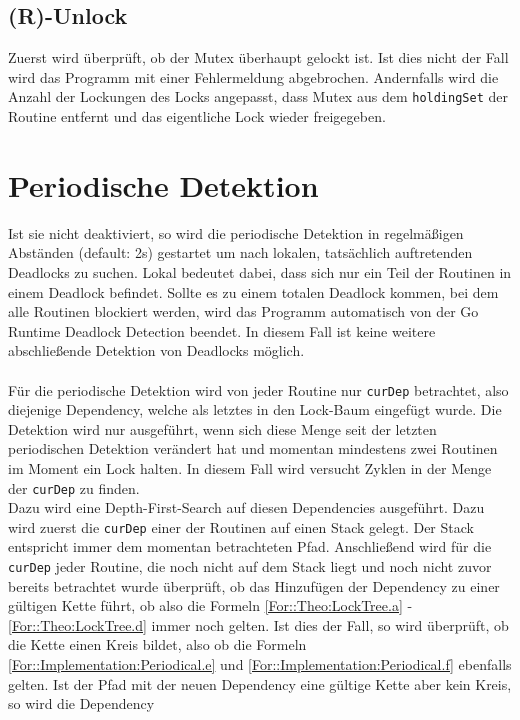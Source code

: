 \subsection{(R)-Unlock}
Zuerst wird überprüft, ob der Mutex überhaupt gelockt ist. Ist dies nicht der 
Fall wird das Programm mit einer Fehlermeldung abgebrochen. Andernfalls
wird die Anzahl der Lockungen des Locks angepasst, dass Mutex aus dem 
\texttt{holdingSet} der Routine entfernt und das eigentliche Lock wieder freigegeben.

\section{Periodische Detektion} \label{Kap::Implementation:Periodical}
Ist sie nicht deaktiviert, so wird die periodische Detektion in regelmäßigen 
Abständen (default: 2s) gestartet
um nach lokalen, tatsächlich auftretenden Deadlocks zu suchen. Lokal bedeutet 
dabei, dass sich nur ein Teil der Routinen in einem Deadlock befindet. Sollte 
es zu einem totalen Deadlock kommen, bei dem alle Routinen blockiert werden, 
wird das Programm automatisch von der Go Runtime Deadlock Detection
beendet. In 
diesem Fall ist keine weitere abschließende Detektion von Deadlocks möglich.\\\\
Für die periodische Detektion wird von jeder Routine nur \texttt{curDep} betrachtet,
also diejenige Dependency, welche als letztes in den Lock-Baum eingefügt wurde. 
Die Detektion wird nur ausgeführt, wenn sich diese Menge seit der letzten 
periodischen Detektion verändert hat und momentan mindestens zwei Routinen im 
Moment ein Lock halten.
In diesem Fall wird versucht Zyklen in der Menge der \texttt{curDep} zu finden.\\
Dazu wird eine Depth-First-Search auf diesen Dependencies ausgeführt. Dazu wird 
zuerst die \texttt{curDep} einer der Routinen auf einen Stack gelegt. Der Stack 
entspricht immer dem momentan betrachteten Pfad. Anschließend wird für 
die \texttt{curDep} jeder Routine, die noch nicht auf dem Stack liegt und noch 
nicht zuvor bereits betrachtet wurde überprüft,
ob das Hinzufügen der Dependency zu einer gültigen Kette führt, ob also 
die Formeln \eqref{For::Theo:LockTree.a} - \eqref{For::Theo:LockTree.d} immer noch 
gelten. Ist dies der Fall, so wird überprüft, ob die Kette einen Kreis 
bildet, also ob die Formeln \eqref{For::Implementation:Periodical.e} und 
\eqref{For::Implementation:Periodical.f} ebenfalls gelten. Ist der Pfad mit der 
neuen Dependency eine gültige Kette aber kein Kreis, so wird die Dependency
